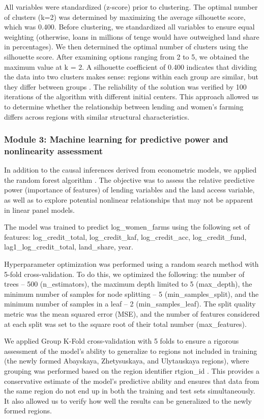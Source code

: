 \documentclass[pdflatex,sn-mathphys-ay]{sn-jnl}
\begin{document}
All variables were standardized (z-score) prior to clustering. The
optimal number of clusters (k=2) was determined by maximizing the
average silhouette score, which was 0.400. Before clustering, we
standardized all variables to ensure equal weighting (otherwise, loans
in millions of tenge would have outweighed land share in percentages).
We then determined the optimal number of clusters using the silhouette
score. After examining options ranging from 2 to 5, we obtained the
maximum value at k = 2. A silhouette coefficient of 0.400 indicates that
dividing the data into two clusters makes sense: regions within each
group are similar, but they differ between groups \citep{ref45}. The reliability of the solution was verified by 100 iterations
of the algorithm with different initial centers. This approach allowed
us to determine whether the relationship between lending and women's
farming differs across regions with similar structural characteristics.

\subsubsection{Module 3: Machine learning for predictive power and nonlinearity assessment}

In addition to the causal inferences derived from econometric models, we
applied the random forest algorithm \citep{ref83}. The
objective was to assess the relative predictive power (importance of
features) of lending variables and the land access variable, as well as
to explore potential nonlinear relationships that may not be apparent in
linear panel models.

The model was trained to predict log\_women\_farms using the following
set of features: log\_credit\_total, log\_credit\_kaf, log\_credit\_acc,
log\_credit\_fund, lag1\_log\_credit\_total, land\_share, year.

Hyperparameter optimization was performed using a random search method
with 5-fold cross-validation. To do this, we optimized the following:
the number of trees -- 500 (n\_estimators), the maximum depth limited to
5 (max\_depth), the minimum number of samples for node splitting -- 5
(min\_samples\_split), and the minimum number of samples in a leaf -- 2
(min\_samples\_leaf). The split quality metric was the mean squared
error (MSE), and the number of features considered at each split was set
to the square root of their total number (max\_features).

We applied Group K-Fold cross-validation with 5 folds to ensure a
rigorous assessment of the model's ability to generalize to regions not
included in training (the newly formed Abayskaya, Zhetysuskaya, and
Ulytauskaya regions), where grouping was performed based on the region
identifier rtgion\_id \citep{ref65}. This provides a
conservative estimate of the model's predictive ability and ensures that
data from the same region do not end up in both the training and test
sets simultaneously. It also allowed us to verify how well the results
can be generalized to the newly formed regions.
\end{document}
